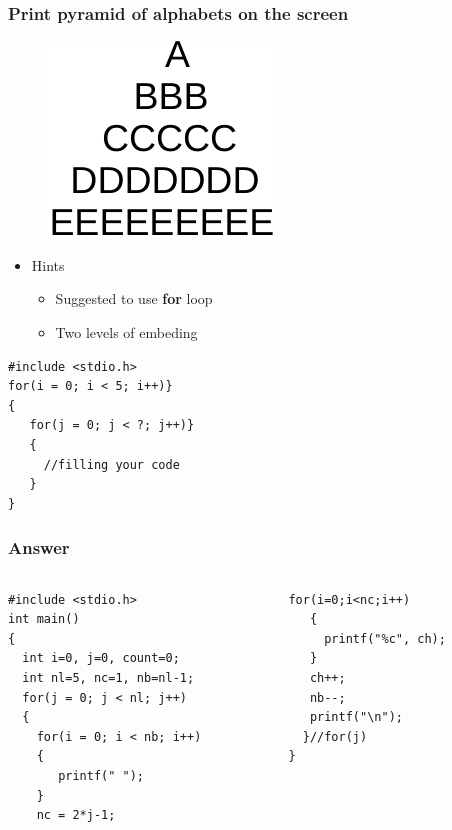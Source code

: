 \begin{frame}[fragile]
\frametitle{Print pyramid of alphabets on the screen}
\vspace{0.1in}
\begin{figure}
	\includegraphics[width=0.15\linewidth]{figs/stars.pdf}
\end{figure}
\begin{itemize}
	\item {Hints}
	\begin{itemize}
		\item {Suggested to use \textbf{for} loop}
		\item {Two levels of embeding}
	\end{itemize}
\end{itemize}
\begin{lstlisting}
#include <stdio.h>
for(i = 0; i < 5; i++)}
{
   for(j = 0; j < ?; j++)}
   {
     //filling your code   
   }
}
\end{lstlisting}
\end{frame}


\ifx\answer\undefined
\begin{frame}[fragile]
\frametitle{Answer}
\vspace{-0.15in}
\begin{columns}
\begin{column}{0.55\linewidth}
	\begin{lstlisting}[xleftmargin=0.02\linewidth]
#include <stdio.h>
int main()
{
  int i=0, j=0, count=0;
  int nl=5, nc=1, nb=nl-1;
  for(j = 0; j < nl; j++)
  {
    for(i = 0; i < nb; i++)
    {
       printf(" ");
    }
    nc = 2*j-1;
\end{lstlisting}
\end{column}
\begin{column}{0.45\linewidth}
\begin{lstlisting}[firstnumber=13]
   for(i=0;i<nc;i++)
   {
     printf("%c", ch);
   }
   ch++;
   nb--;
   printf("\n");
  }//for(j)
}
	\end{lstlisting}
\end{column}
\end{columns}
\end{frame}
\fi

